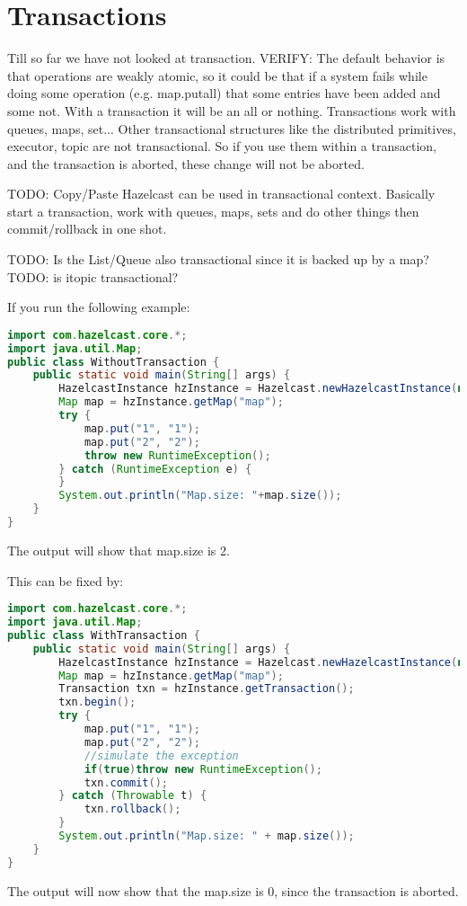 \chapter{Transactions}
Till so far we have not looked at transaction. VERIFY: The default behavior is that operations are weakly atomic, so it could be that if a system fails while doing some operation (e.g. map.putall) that some entries have been added and some not. With a transaction it will be an all or nothing. Transactions work with queues, maps, set... Other transactional structures like the distributed primitives, executor, topic are not transactional. So if you use them within a transaction, and the transaction is aborted, these change will not be aborted.

TODO: Copy/Paste
Hazelcast can be used in transactional context. Basically start a transaction, work with queues, maps, sets and do other things then commit/rollback in one shot.

TODO: Is the List/Queue also transactional since it is backed up by a map? 
TODO: is itopic transactional?

If you run the following example:
\begin{lstlisting}[language=java]
import com.hazelcast.core.*;
import java.util.Map;
public class WithoutTransaction {
    public static void main(String[] args) {
        HazelcastInstance hzInstance = Hazelcast.newHazelcastInstance(null);
        Map map = hzInstance.getMap("map");
        try {
            map.put("1", "1");
            map.put("2", "2");
            throw new RuntimeException();
        } catch (RuntimeException e) {
        }
        System.out.println("Map.size: "+map.size());
    }
}
\end{lstlisting}
The output will show that map.size is 2.

This can be fixed by:
\begin{lstlisting}[language=java]
import com.hazelcast.core.*;
import java.util.Map;
public class WithTransaction {
    public static void main(String[] args) {
        HazelcastInstance hzInstance = Hazelcast.newHazelcastInstance(null);
        Map map = hzInstance.getMap("map");
        Transaction txn = hzInstance.getTransaction();
        txn.begin();
        try {
            map.put("1", "1");
            map.put("2", "2");
            //simulate the exception
            if(true)throw new RuntimeException();
            txn.commit();
        } catch (Throwable t) {
            txn.rollback();
        }
        System.out.println("Map.size: " + map.size());
    }
}
\end{lstlisting}
The output will now show that the map.size is 0, since the transaction is aborted.


